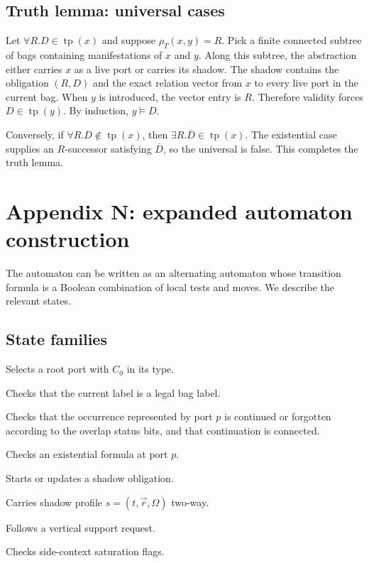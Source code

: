 \documentclass[11pt]{article}
\newcommand{\tp}{\operatorname{tp}}
\begin{document}
\subsection{Truth lemma: universal cases}

Let $\forall R.D\in\tp(x)$ and suppose $\rho_T(x,y)=R$.  Pick a finite connected subtree of bags containing manifestations of $x$ and $y$.  Along this subtree, the abstraction either carries $x$ as a live port or carries its shadow.  The shadow contains the obligation $(R,D)$ and the exact relation vector from $x$ to every live port in the current bag.  When $y$ is introduced, the vector entry is $R$.  Therefore validity forces $D\in\tp(y)$.  By induction, $y\models D$.

Conversely, if $\forall R.D\notin\tp(x)$, then $\exists R.\overline D\in\tp(x)$.  The existential case supplies an $R$-successor satisfying $\overline D$, so the universal is false.  This completes the truth lemma.

\section{Appendix N: expanded automaton construction}

The automaton can be written as an alternating automaton whose transition formula is a Boolean combination of local tests and moves.  We describe the relevant states.

\subsection{State families}

\begin{description}[leftmargin=3cm,style=nextline]
\item[$q_{\mathrm{init}}$.] Selects a root port with $C_0$ in its type.
\item[$q_{\mathrm{loc}}$.] Checks that the current label is a legal bag label.
\item[$q_{\mathrm{ov}}(p)$.] Checks that the occurrence represented by port $p$ is continued or forgotten according to the overlap status bits, and that continuation is connected.
\item[$q_{\exists}(p,\exists R.D)$.] Checks an existential formula at port $p$.
\item[$q_{\forall}(p,\forall R.D)$.] Starts or updates a shadow obligation.
\item[$q_{\mathrm{sh}}(s)$.] Carries shadow profile $s=(t,\vec r,\Omega)$ two-way.
\item[$q_{\mathrm{req}}(p,R,D)$.] Follows a vertical support request.
\item[$q_{\mathrm{sat}}$.] Checks side-context saturation flags.
\end{description}
\end{document}
